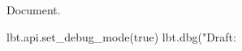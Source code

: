 \documentclass[a4paper,11pt]{article}
\begin{document}
  Document.

  \directlua{}
  \begin{luacode*}
    lbt.api.set_debug_mode(true)
    lbt.dbg("Draft: %
  \end{luacode*}
\end{document}
